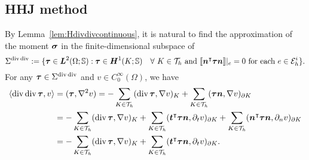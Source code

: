 \subsection{HHJ method}
By Lemma~\ref{lem:Hdivdivcontinuous}, it is natural to find the approximation of the moment $\boldsymbol\sigma$ in the finite-dimensional subspace of
\[
\Sigma^{\operatorname{div}\operatorname{div}}:=\{\boldsymbol\tau\in\boldsymbol L^2(\Omega;\mathbb S):\boldsymbol\tau\in \boldsymbol H^1(K;\mathbb S)\quad\forall~K\in\mathcal T_h\textrm{ and }\llbracket \boldsymbol{n}^{\intercal}\boldsymbol\tau\boldsymbol{n}\rrbracket|_e=0\textrm{ for each } e\in\mathcal E_h^i\}.
\]
For any $\boldsymbol\tau\in\Sigma^{\operatorname{div}\operatorname{div}}$ and $v\in C_0^{\infty}(\Omega)$, we have
\begin{align*}
\langle \operatorname{div}\operatorname{div}\boldsymbol\tau, v\rangle&=(\boldsymbol\tau, \nabla^2v)=-\sum_{K\in\mathcal T_h}(\operatorname{div}\boldsymbol\tau, \nabla v)_K+\sum_{K\in\mathcal T_h}(\boldsymbol\tau\boldsymbol{n}, \nabla v)_{\partial K} \\
&=-\sum_{K\in\mathcal T_h}(\operatorname{div}\boldsymbol\tau, \nabla v)_K+\sum_{K\in\mathcal T_h}(\boldsymbol{t}^{\intercal}\boldsymbol\tau\boldsymbol{n}, \partial_t v)_{\partial K}+\sum_{K\in\mathcal T_h}(\boldsymbol{n}^{\intercal}\boldsymbol\tau\boldsymbol{n}, \partial_{n} v)_{\partial K}  \\
&=-\sum_{K\in\mathcal T_h}(\operatorname{div}\boldsymbol\tau, \nabla v)_K+\sum_{K\in\mathcal T_h}(\boldsymbol{t}^{\intercal}\boldsymbol\tau\boldsymbol{n}, \partial_t v)_{\partial K}.
\end{align*}

